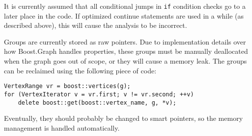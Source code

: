 It is currently assumed that all conditional jumps in \verb+if+ condition checks go to a later place in the code. If optimized continue statements are used in a while (as described above), this will cause the analysis to be incorrect.

Groups are currently stored as raw pointers. Due to implementation details over how Boost.Graph handles properties, these groups must be manually deallocated when the graph goes out of scope, or they will cause a memory leak. The groups can be reclaimed using the following piece of code:
\begin{C++}
\begin{lstlisting}
VertexRange vr = boost::vertices(g);
for (VertexIterator v = vr.first; v != vr.second; ++v)
	delete boost::get(boost::vertex_name, g, *v);
\end{lstlisting}
\end{C++}
Eventually, they should probably be changed to smart pointers, so the memory management is handled automatically.
